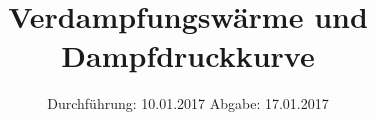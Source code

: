 


\subject{V203}
\title{Verdampfungswärme und Dampfdruckkurve}
\date{
	Durchführung: 10.01.2017
	\hspace{4em}
	Abgabe: 17.01.2017
}


	\maketitle
	\newpage
	\tableofcontents
	\newpage
	
	
	
	
	
	
	\newpage
	
	\printbibliography

